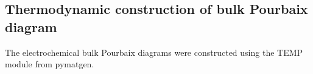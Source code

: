 



\subsection{Thermodynamic construction of bulk Pourbaix diagram}
%
%
The electrochemical bulk Pourbaix diagrams were constructed using the TEMP module from pymatgen.







\begin{table}
\centering
\caption{\label{table:bulk_pourb}
%
Enthalpy (\DHf) and free energies (\DGf) of formation per formula unit (f.u.) for the species that make up the bulk Pourbaix diagrams
(see Figures \ref{fig:bulk_pourbaix} and \ref{fig:bulk_pourbaix_wo_alpha}).
%
The Ir metal reference is fitted such that the experimental \DHf of \rIrOtwo is reproduced.~\cite{Barin1995}
%
The $IrO_{4}^{-}$ ion species energy is taken from Douglas (1988)~\cite{Adams1988}.
}

\end{table}


